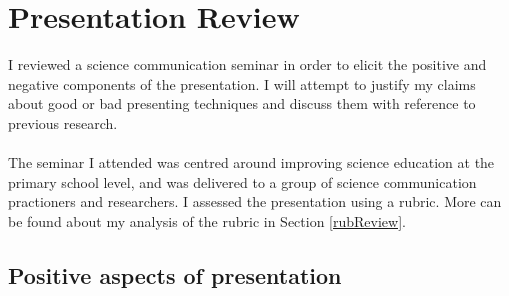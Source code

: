 \section{Presentation Review} \label{semRev}

I reviewed a science communication seminar in order to elicit the positive and negative components of
the presentation.
I will attempt to justify my claims about good or bad presenting techniques and
discuss them with reference to previous research.\\
\\
The seminar I attended was centred around improving science education at the primary school level,
and was delivered to a group of science communication practioners and researchers.
I assessed the presentation using a rubric.
More can be found about my analysis of the rubric in Section \ref{rubReview}.

\subsection{Positive aspects of presentation} \label{semRevPlus}

